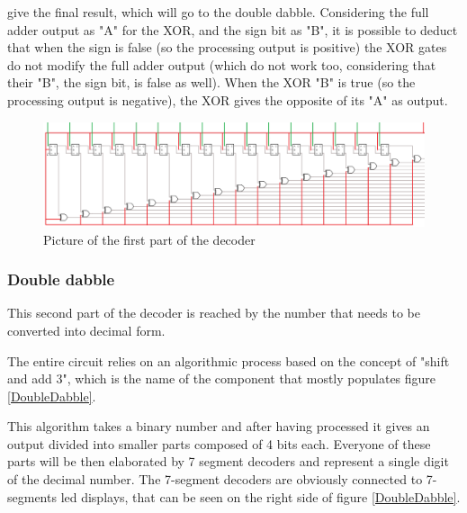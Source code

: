 \documentclass{article}
\begin{document}
give the final result, which will go to the double dabble. Considering the full adder output as "A" for the XOR, and the sign bit as "B", it is possible to deduct that when the sign is false (so the processing output is positive) the XOR gates do not modify the full adder output (which do not work too, considering that their "B", the sign bit, is false as well). When the XOR "B" is true (so the processing output is negative), the XOR gives the opposite of its "A" as output.

\begin{figure}[h]
    \centering
    \includegraphics[scale=0.43]{SC_Converter.PNG}
    \caption{Picture of the first part of the decoder}
    \label{Converter}
  \end{figure}

\subsubsection{Double dabble}

This second part of the decoder is reached by the number that needs to be converted into decimal form. 

The entire circuit relies on an algorithmic process based on the concept of "shift and add 3", which is the name of the component that mostly populates figure \ref{DoubleDabble}.

This algorithm takes a binary number and after having processed it gives an output divided into smaller parts composed of 4 bits each. Everyone of these parts will be then elaborated by 7 segment decoders and represent a single digit of the decimal number. The 7-segment decoders are obviously connected to 7-segments led displays, that can be seen on the right side of figure \ref{DoubleDabble}.
\end{document}
